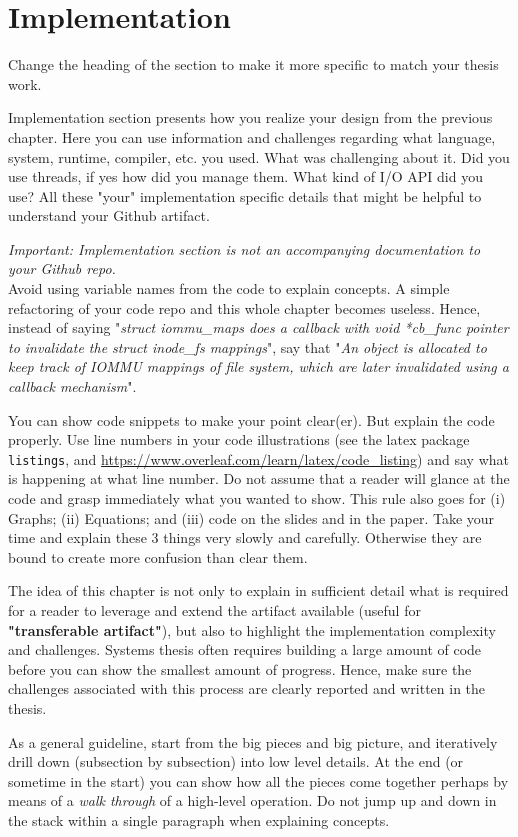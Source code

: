 \section{Implementation} 
Change the heading of the section to make it more specific to match your thesis work. 

Implementation section presents how you realize your design from the previous chapter. Here you can use information and challenges regarding what language, system, runtime, compiler, etc. you used. What was challenging about it. Did you use threads, if yes how did you manage them. What kind of I/O API did you use? All these "your" implementation specific details that might be helpful to understand your Github artifact. 

$ $\\
\textit{Important: Implementation section is not an accompanying documentation to your Github repo.} $ $\\

Avoid using variable names from the code to explain concepts. A simple refactoring of your code repo and this whole chapter becomes useless. Hence, instead of saying "\textit{struct iommu\_maps does a callback with void *cb\_func pointer to invalidate the struct inode\_fs mappings}", say that "\textit{An object is allocated to keep track of IOMMU mappings of file system, which are later invalidated using a callback mechanism}". 

You can show code snippets to make your point clear(er). But explain the code properly. Use line numbers in your code illustrations (see the latex package \texttt{listings}, and \url{https://www.overleaf.com/learn/latex/code_listing}) and say what is happening at what line number. Do not assume that a reader will glance at the code and grasp immediately what you wanted to show. This rule also goes for (i) Graphs; (ii) Equations; and (iii) code on the slides and in the paper. Take your time and explain these 3 things very slowly and carefully. Otherwise they are bound to create more confusion than clear them. 

The idea of this chapter is not only to explain in sufficient detail what is required for a reader to leverage and extend the artifact available (useful for \textbf{"transferable artifact"}), but also to highlight the implementation complexity and challenges. Systems thesis often requires building a large amount of code before you can show the smallest amount of progress. Hence, make sure the challenges associated with this process are clearly reported and written in the thesis. 


As a general guideline, start from the big pieces and big picture, and iteratively drill down (subsection by subsection) into low level details. At the end (or sometime in the start) you can show how all the pieces come together perhaps by means of a \textit{walk through} of a high-level operation. Do not jump up and down in the stack within a single paragraph when explaining concepts. 
